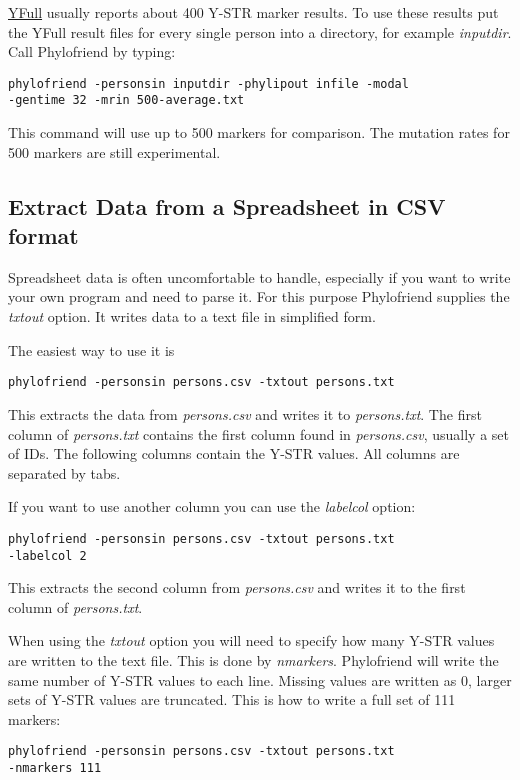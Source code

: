 \href{http://yfull.com/}{YFull} usually reports about 400
Y-STR marker results. To use these results put the YFull 
result files for every single person into a directory, for
example \emph{inputdir}. Call Phylofriend by typing:

\noindent\texttt{phylofriend -personsin inputdir -phylipout infile -modal\\
-gentime 32 -mrin 500-average.txt}

This command will use up to 500 markers for comparison. The
mutation rates for 500 markers are still experimental.



\subsection{Extract Data from a Spreadsheet in CSV format}

Spreadsheet data is often uncomfortable to handle, especially
if you want to write your own program and need to parse it.
For this purpose Phylofriend supplies the \emph{txtout}
option. It writes data to a text file in simplified form.

The easiest way to use it is

\noindent\texttt{phylofriend -personsin persons.csv -txtout persons.txt}

This extracts the data from \emph{persons.csv} and writes
it to \emph{persons.txt}. The first column of \emph{persons.txt}
contains the first column found in \emph{persons.csv}, usually
a set of IDs. The following columns contain the Y-STR values.
All columns are separated by tabs.

If you want to use another column you can use the
\emph{labelcol} option:

\noindent\texttt{phylofriend -personsin persons.csv -txtout persons.txt\\
-labelcol 2}

This extracts the second column from \emph{persons.csv} and
writes it to the first column of \emph{persons.txt}.

When using the \emph{txtout} option you will need to specify
how many Y-STR values are written to the text file. This is
done by \emph{nmarkers}. Phylofriend will write the same number
of Y-STR values to each line. Missing values are written as
0, larger sets of Y-STR values are truncated. This is how to
write a full set of 111 markers:

\noindent\texttt{phylofriend -personsin persons.csv -txtout persons.txt\\
-nmarkers 111}
















